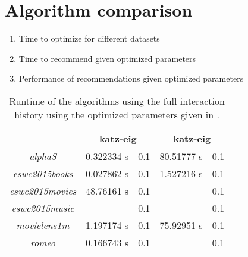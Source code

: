 
\section{Algorithm comparison}


\begin{enumerate}
    \item Time to optimize for different datasets
    \item Time to recommend given optimized parameters
    \item Performance of recommendations given optimized parameters
\end{enumerate}


\begin{table}[h!]
    \centering
    \begin{tabular}{| c | c | c | c | c |}
        \hline
        \textbf{}               & \multicolumn{2}{c|}{\textbf{katz-eig}} & \multicolumn{2}{c|}{\textbf{katz-eig}} \\ \hline
        \textit{alphaS}         & 0.322334 s & 0.1        & 80.51777 s   & 0.1           \\ \hline
        \textit{eswc2015books}  & 0.027862 s & 0.1        & 1.527216 s   & 0.1           \\ \hline
        \textit{eswc2015movies} & 48.76161 s & 0.1        &              & 0.1           \\ \hline
        \textit{eswc2015music}  &            & 0.1        &              & 0.1           \\ \hline
        \textit{movielens1m}    & 1.197174 s & 0.1        & 75.92951 s   & 0.1           \\ \hline
        \textit{romeo}          & 0.166743 s & 0.1        &              & 0.1           \\ \hline
    \end{tabular}
    \caption{Runtime of the algorithms using the full interaction history using the optimized parameters given in .}
    \label{tab:alg_full_time}
\end{table}

